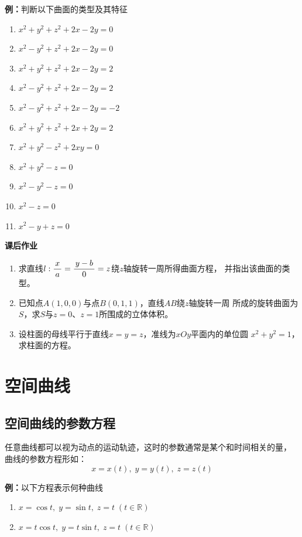 {\bf 例：}判断以下曲面的类型及其特征
\begin{enumerate}[(1)]
  \setlength{\itemindent}{1cm}
  \item $x^2+y^2+z^2+2x-2y=0$
  \item $x^2-y^2+z^2+2x-2y=0$
  \item $x^2+y^2+z^2+2x-2y=2$
  \item $x^2-y^2+z^2+2x-2y=2$
  \item $x^2-y^2+z^2+2x-2y=-2$
  \item $x^2+y^2+z^2+2x+2y=2$
  \item $x^2+y^2-z^2+2xy=0$
  \item $x^2+y^2-z=0$
  \item $x^2-y^2-z=0$
  \item $x^2-z=0$
  \item $x^2-y+z=0$
\end{enumerate}

\begin{ext}
	{\bf 课后作业}
	\begin{enumerate}
	  \item 求直线$l:\displaystyle\frac{\,{x}\,}{\,{a}\,}=\displaystyle\frac{\,{y-b}\,}{\,{0}\,}=z$绕$z$轴旋转一周所得曲面方程，
	  并指出该曲面的类型。
	  \item 已知点$A(1,0,0)$与点$B(0,1,1)$，直线$AB$绕$z$轴旋转一周
	  所成的旋转曲面为$S$，求$S$与$z=0$、$z=1$所围成的立体体积。
	  \item 设柱面的母线平行于直线$x=y=z$，准线为$xOy$平面内的单位圆
	  $x^2+y^2=1$，求柱面的方程。
	\end{enumerate}
\end{ext}

\newpage

\section{空间曲线}

\subsection{空间曲线的参数方程}

任意曲线都可以视为动点的运动轨迹，这时的参数通常是某个和时间相关的量，
曲线的参数方程形如：
$$x=x(t),\;y=y(t),\;z=z(t)$$

{\bf 例：}以下方程表示何种曲线
\begin{enumerate}[(1)]
  \setlength{\itemindent}{1cm}
  \item $x=\cos t,\;y=\sin t,\;z=t\;(t\in\mathbb{R})$ 
  \item $x=t\cos t,\;y=t\sin t,\;z=t\;(t\in\mathbb{R})$ 
\end{enumerate}

